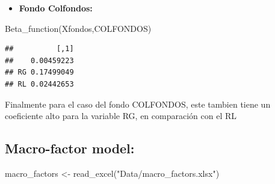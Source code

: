 \documentclass[
  12pt,
]{article}
\newenvironment{Shaded}{\begin{snugshade}}{\end{snugshade}}
\newcommand{\DecValTok}[1]{\textcolor[rgb]{0.00,0.00,0.81}{#1}}
\newcommand{\FunctionTok}[1]{\textcolor[rgb]{0.00,0.00,0.00}{#1}}
\newcommand{\NormalTok}[1]{#1}
\newcommand{\OtherTok}[1]{\textcolor[rgb]{0.56,0.35,0.01}{#1}}
\newcommand{\SpecialCharTok}[1]{\textcolor[rgb]{0.00,0.00,0.00}{#1}}
\newcommand{\StringTok}[1]{\textcolor[rgb]{0.31,0.60,0.02}{#1}}
\providecommand{\tightlist}{%
  \setlength{\itemsep}{0pt}\setlength{\parskip}{0pt}}
\begin{document}
\begin{itemize}
\tightlist
\item
  \textbf{Fondo Colfondos:}
\end{itemize}

\begin{Shaded}
\begin{Highlighting}[]
\FunctionTok{Beta\_function}\NormalTok{(Xfondos,COLFONDOS)}
\end{Highlighting}
\end{Shaded}

\begin{verbatim}
##          [,1]
##    0.00459223
## RG 0.17499049
## RL 0.02442653
\end{verbatim}

Finalmente para el caso del fondo COLFONDOS, este tambien tiene un
coeficiente alto para la variable RG, en comparación con el RL

\hypertarget{macro-factor-model}{%
\subsection{Macro-factor model:}\label{macro-factor-model}}

\begin{Shaded}
\begin{Highlighting}[]
\NormalTok{macro\_factors }\OtherTok{\textless{}{-}} \FunctionTok{read\_excel}\NormalTok{(}\StringTok{"Data/macro\_factors.xlsx"}\NormalTok{)}
\end{Highlighting}
\end{Shaded}

\begin{Shaded}
\end{Shaded}
\end{document}

